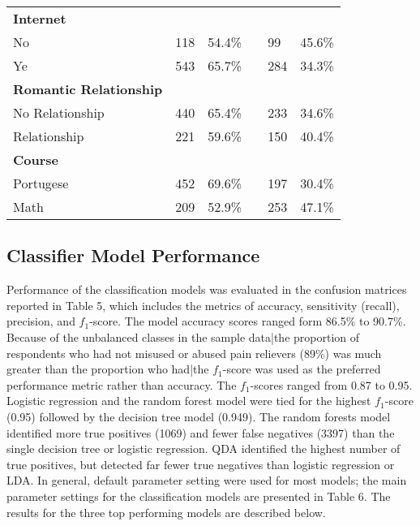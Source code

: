 \documentclass[sigconf]{acmart}
\begin{document}
\begin{table}
\begin{tabular}{llllll}
    \midrule
    \textbf{Internet} &  &  &  &  & \\
    No        & 118 & 54.4\% & &  99 & 45.6\%  \\
    Ye        & 543 & 65.7\% & & 284 & 34.3\%  \\
    \midrule
    \textbf{Romantic Relationship} &  &  &  &  & \\
    No Relationship & 440 & 65.4\% & & 233 & 34.6\%  \\
    Relationship    & 221 & 59.6\% & & 150 & 40.4\%  \\    
    \midrule
    \textbf{Course} &  &  &  &  & \\
    Portugese  & 452 & 69.6\% & & 197 & 30.4\%  \\
    Math       & 209 & 52.9\% & & 253 & 47.1\%  \\
    \bottomrule
  \end{tabular}
\end{table}



\subsection{Classifier Model Performance}

Performance of the classification models was evaluated in the confusion 
matrices reported in Table 5, which includes the metrics of accuracy, 
sensitivity (recall), precision, and $f_1$-score. The model accuracy 
scores ranged form 86.5\% to 90.7\%. Because of the unbalanced classes in 
the sample data|the proportion of respondents who had not misused or abused 
pain relievers (89\%) was much greater than the proportion who had|the 
$f_1$-score was used as the preferred performance metric rather than 
accuracy. The $f_1$-scores ranged from 0.87 to 0.95. Logistic regression 
and the random forest model were tied for the highest $f_1$-score (0.95) 
followed by the decision tree model (0.949). The random forests model 
identified more true positives (1069) and fewer false negatives (3397) 
than the single decision tree or logistic regression. QDA identified 
the highest number of true positives, but detected far fewer true negatives
than logistic regression or LDA. In general, default parameter setting 
were used for most models; the main parameter settings for the 
classification models are presented in Table 6. The results for the 
three top performing models are described below.  
\end{document}

